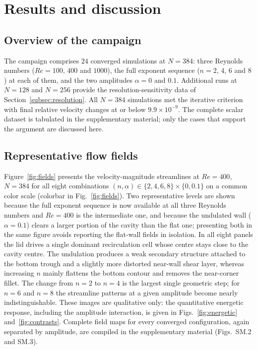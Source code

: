 \section{Results and discussion}
\label{sec:results}

\subsection{Overview of the campaign}
\label{subsec:overview}

The campaign comprises $24$ converged simulations at $N=384$: three Reynolds numbers ($Re=100$, $400$ and $1000$), the full exponent sequence ($n=2$, $4$, $6$ and $8$) at each of them, and the two amplitudes $\alpha=0$ and $0.1$. Additional runs at $N=128$ and $N=256$ provide the resolution-sensitivity data of Section~\ref{subsec:resolution}. All $N=384$ simulations met the iterative criterion with final relative velocity changes at or below $9.9\times10^{-9}$. The complete scalar dataset is tabulated in the supplementary material; only the cases that support the argument are discussed here.

\subsection{Representative flow fields}
\label{subsec:fields}

Figure~\ref{fig:fields} presents the velocity-magnitude streamlines at $Re=400$, $N=384$ for all eight combinations $(n,\alpha)\in\{2,4,6,8\}\times\{0,0.1\}$ on a common color scale (colorbar in Fig.~\ref{fig:fields}). Two representative levels are shown because the full exponent sequence is now available at all three Reynolds numbers and $Re=400$ is the intermediate one, and because the undulated wall ($\alpha=0.1$) clears a larger portion of the cavity than the flat one; presenting both in the same figure avoids reporting the flat-wall fields in isolation. In all eight panels the lid drives a single dominant recirculation cell whose centre stays close to the cavity centre. The undulation produces a weak secondary structure attached to the bottom trough and a slightly more distorted near-wall shear layer, whereas increasing $n$ mainly flattens the bottom contour and removes the near-corner fillet. The change from $n=2$ to $n=4$ is the largest single geometric step; for $n=6$ and $n=8$ the streamline patterns at a given amplitude become nearly indistinguishable. These images are qualitative only: the quantitative energetic response, including the amplitude interaction, is given in Figs.~\ref{fig:energetic} and~\ref{fig:contrasts}. Complete field maps for every converged configuration, again separated by amplitude, are compiled in the supplementary material (Figs.~SM.2 and SM.3).

